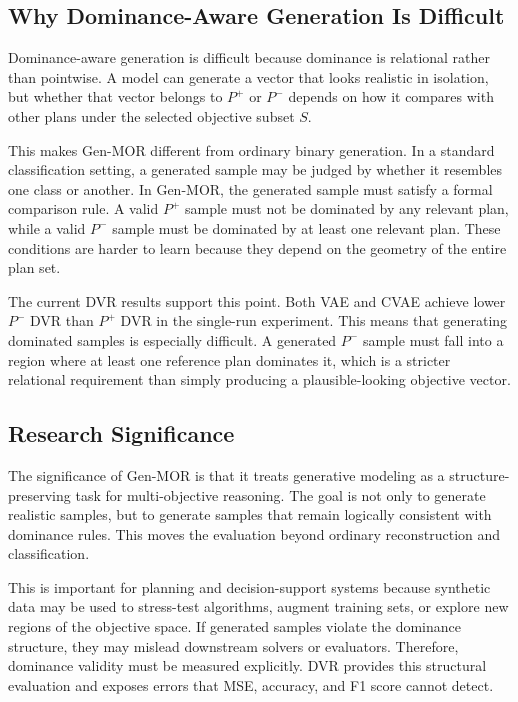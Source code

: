 \subsection{Why Dominance-Aware Generation Is Difficult}
\label{subsec:why_dominance_generation_difficult}

Dominance-aware generation is difficult because dominance is relational rather than pointwise. A model can generate a vector that looks realistic in isolation, but whether that vector belongs to $P^{+}$ or $P^{-}$ depends on how it compares with other plans under the selected objective subset $S$.

This makes Gen-MOR different from ordinary binary generation. In a standard classification setting, a generated sample may be judged by whether it resembles one class or another. In Gen-MOR, the generated sample must satisfy a formal comparison rule. A valid $P^{+}$ sample must not be dominated by any relevant plan, while a valid $P^{-}$ sample must be dominated by at least one relevant plan. These conditions are harder to learn because they depend on the geometry of the entire plan set.

The current DVR results support this point. Both VAE and CVAE achieve lower $P^{-}$ DVR than $P^{+}$ DVR in the single-run experiment. This means that generating dominated samples is especially difficult. A generated $P^{-}$ sample must fall into a region where at least one reference plan dominates it, which is a stricter relational requirement than simply producing a plausible-looking objective vector.

\subsection{Research Significance}
\label{subsec:research_significance}

The significance of Gen-MOR is that it treats generative modeling as a structure-preserving task for multi-objective reasoning. The goal is not only to generate realistic samples, but to generate samples that remain logically consistent with dominance rules. This moves the evaluation beyond ordinary reconstruction and classification.

This is important for planning and decision-support systems because synthetic data may be used to stress-test algorithms, augment training sets, or explore new regions of the objective space. If generated samples violate the dominance structure, they may mislead downstream solvers or evaluators. Therefore, dominance validity must be measured explicitly. DVR provides this structural evaluation and exposes errors that MSE, accuracy, and F1 score cannot detect.

